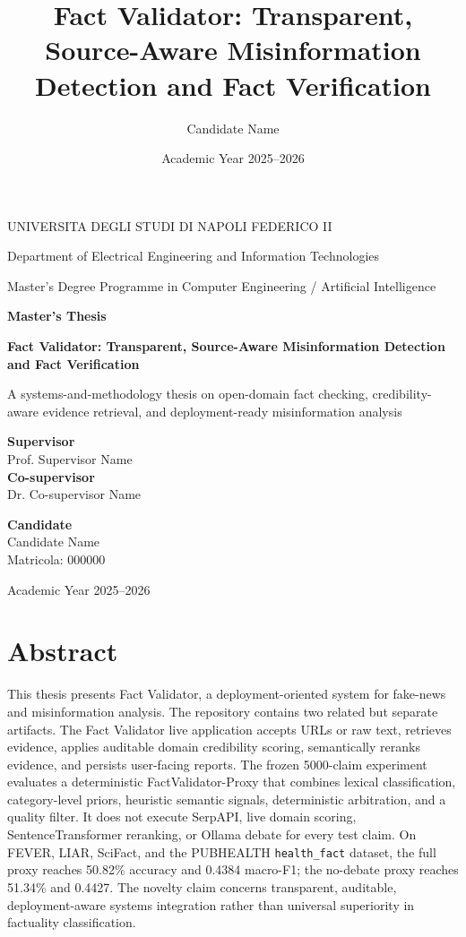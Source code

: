 \documentclass[12pt,a4paper,openright]{report}
\title{Fact Validator: Transparent, Source-Aware Misinformation Detection and Fact Verification}
\author{Candidate Name}
\date{Academic Year 2025--2026}
\begin{document}
\begin{titlepage}
\begin{center}
{\Large UNIVERSITA DEGLI STUDI DI NAPOLI FEDERICO II\par}
\vspace{0.5cm}
{\large Department of Electrical Engineering and Information Technologies\par}
\vspace{0.3cm}
{\large Master's Degree Programme in Computer Engineering / Artificial Intelligence\par}
\vspace{1.7cm}
{\Large \textbf{Master's Thesis}\par}
\vspace{1.2cm}
{\LARGE \textbf{Fact Validator: Transparent, Source-Aware Misinformation Detection and Fact Verification}\par}
\vspace{1.2cm}
{\large A systems-and-methodology thesis on open-domain fact checking, credibility-aware evidence retrieval, and deployment-ready misinformation analysis\par}
\vfill
\begin{minipage}[t]{0.45\textwidth}
\raggedright
\textbf{Supervisor}\\
Prof. Supervisor Name\\[0.4cm]
\textbf{Co-supervisor}\\
Dr. Co-supervisor Name
\end{minipage}
\hfill
\begin{minipage}[t]{0.45\textwidth}
\raggedleft
\textbf{Candidate}\\
Candidate Name\\
Matricola: 000000
\end{minipage}
\vfill
{\large Academic Year 2025--2026\par}
\end{center}
\end{titlepage}


\chapter*{Abstract}
This thesis presents Fact Validator, a deployment-oriented system for fake-news and misinformation analysis. The repository contains two related but separate artifacts. The Fact Validator live application accepts URLs or raw text, retrieves evidence, applies auditable domain credibility scoring, semantically reranks evidence, and persists user-facing reports. The frozen 5000-claim experiment evaluates a deterministic FactValidator-Proxy that combines lexical classification, category-level priors, heuristic semantic signals, deterministic arbitration, and a quality filter. It does not execute SerpAPI, live domain scoring, SentenceTransformer reranking, or Ollama debate for every test claim. On FEVER, LIAR, SciFact, and the PUBHEALTH \texttt{health\_fact} dataset, the full proxy reaches 50.82\% accuracy and 0.4384 macro-F1; the no-debate proxy reaches 51.34\% and 0.4427. The novelty claim concerns transparent, auditable, deployment-aware systems integration rather than universal superiority in factuality classification.
\end{document}
